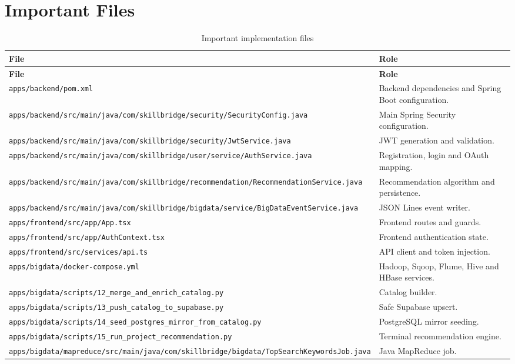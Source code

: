 \documentclass[12pt,a4paper]{report}
\begin{document}
\chapter{Important Files}
\begin{longtable}{p{}p{}}
\caption{Important implementation files}\\
\toprule
\textbf{File} & \textbf{Role}\\
\midrule
\endfirsthead
\toprule
\textbf{File} & \textbf{Role}\\
\midrule
\endhead
\texttt{apps/backend/pom.xml} & Backend dependencies and Spring Boot configuration.\\
\texttt{apps/backend/src/main/java/com/skillbridge/security/SecurityConfig.java} & Main Spring Security configuration.\\
\texttt{apps/backend/src/main/java/com/skillbridge/security/JwtService.java} & JWT generation and validation.\\
\texttt{apps/backend/src/main/java/com/skillbridge/user/service/AuthService.java} & Registration, login and OAuth mapping.\\
\texttt{apps/backend/src/main/java/com/skillbridge/recommendation/RecommendationService.java} & Recommendation algorithm and persistence.\\
\texttt{apps/backend/src/main/java/com/skillbridge/bigdata/service/BigDataEventService.java} & JSON Lines event writer.\\
\texttt{apps/frontend/src/app/App.tsx} & Frontend routes and guards.\\
\texttt{apps/frontend/src/app/AuthContext.tsx} & Frontend authentication state.\\
\texttt{apps/frontend/src/services/api.ts} & API client and token injection.\\
\texttt{apps/bigdata/docker-compose.yml} & Hadoop, Sqoop, Flume, Hive and HBase services.\\
\texttt{apps/bigdata/scripts/12\_merge\_and\_enrich\_catalog.py} & Catalog builder.\\
\texttt{apps/bigdata/scripts/13\_push\_catalog\_to\_supabase.py} & Safe Supabase upsert.\\
\texttt{apps/bigdata/scripts/14\_seed\_postgres\_mirror\_from\_catalog.py} & PostgreSQL mirror seeding.\\
\texttt{apps/bigdata/scripts/15\_run\_project\_recommendation.py} & Terminal recommendation engine.\\
\texttt{apps/bigdata/mapreduce/src/main/java/com/skillbridge/bigdata/TopSearchKeywordsJob.java} & Java MapReduce job.\\
\bottomrule
\end{longtable}
\end{document}
